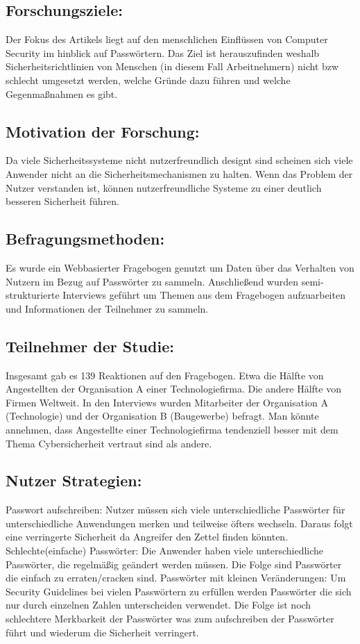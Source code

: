 \subsection{Forschungsziele:}
Der Fokus des Artikels liegt auf den menschlichen Einflüssen von Computer Security im hinblick auf Passwörtern. Das Ziel ist herauszufinden weshalb Sicherheitsrichtlinien von Menschen (in diesem Fall Arbeitnehmern) nicht bzw schlecht umgesetzt werden, welche Gründe dazu führen und welche Gegenmaßnahmen es gibt.

\subsection{Motivation der Forschung:}
Da viele Sicherheitssysteme nicht nutzerfreundlich designt sind scheinen sich viele Anwender nicht an die Sicherheitsmechanismen zu halten. Wenn das Problem der Nutzer verstanden ist, können nutzerfreundliche Systeme zu einer deutlich besseren Sicherheit führen.

\subsection{Befragungsmethoden:}
Es wurde ein Webbasierter Fragebogen genutzt um Daten über das Verhalten von Nutzern im Bezug auf Passwörter zu sammeln. Anschließend wurden semi-strukturierte Interviews geführt um Themen aus dem Fragebogen aufzuarbeiten und Informationen der Teilnehmer zu sammeln.

\subsection{Teilnehmer der Studie:}
Insgesamt gab es 139 Reaktionen auf den Fragebogen. Etwa die Hälfte von Angestellten der Organisation A einer Technologiefirma. Die andere Hälfte von Firmen Weltweit. 
In den Interviews wurden Mitarbeiter der Organisation A (Technologie) und der Organisation B (Baugewerbe) befragt. Man könnte annehmen, dass Angestellte einer Technologiefirma tendenziell besser mit dem Thema Cybersicherheit vertraut sind als andere.

\subsection{Nutzer Strategien:}
Passwort aufschreiben: Nutzer müssen sich viele unterschiedliche Passwörter für unterschiedliche Anwendungen merken und teilweise öfters wechseln. Daraus folgt eine verringerte Sicherheit da Angreifer den Zettel finden könnten. 
Schlechte(einfache) Passwörter: Die Anwender haben viele unterschiedliche Passwörter, die regelmäßig geändert werden müssen. Die Folge sind Passwörter die einfach zu erraten/cracken sind.
Passwörter mit kleinen Veränderungen: Um Security Guidelines bei vielen Passwörtern zu erfüllen werden Passwörter die sich nur durch einzelnen Zahlen unterscheiden verwendet. Die Folge ist noch schlechtere Merkbarkeit der Passwörter was zum aufschreiben der Passwörter führt und wiederum die Sicherheit verringert.

